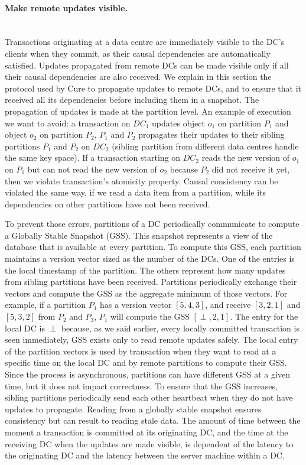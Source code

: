 \documentclass[11pt]{article}
\begin{document}
\paragraph{Make remote updates visible.}\mbox{}\\
Transactions originating at a data centre are immediately visible to the DC's
clients when they commit, as their causal dependencies are automatically
satisfied. Updates propagated from remote DCs can be made visible only if all
their causal dependencies are also received. We explain in this section the
protocol used by Cure to propagate updates to remote DCs, and to ensure that
it received all its dependencies before including them in a snapshot. The
propagation of updates is made at the partition level. An example of execution
we want to avoid: a transaction on $DC_1$ updates object $o_1$ on partition
$P_1$ and object $o_2$ on partition $P_2$, $P_1$ and $P_2$ propagates their
updates to their sibling partitions $P_1$ and $P_2$ on $DC_2$ (sibling
partition from different data centres handle the same key space). If a
transaction starting on $DC_2$ reads the new version of $o_1$ on $P_1$ but can
not read the new version of $o_2$ because $P_2$ did not receive it yet, then
we violate transaction's atomicity property. Causal consistency can be
violated the same way, if we read a data item from a partition, while its
dependencies on other partitions have not been received.

To prevent those errors, partitions of a DC periodically communicate to
compute a Globally Stable Snapshot (GSS). This snapshot represents a view of
the database that is available at every partition. To compute this GSS, each
partition maintains a version vector sized as the number of the DCs. One of
the entries is the local timestamp of the partition. The others represent how
many updates from sibling partitions have been received. Partitions
periodically exchange their vectors and compute the GSS as the aggregate
minimum of those vectors. For example, if a partition $P_1$ has a version
vector $[5, 4, 3]$, and receive $[3, 2, 1]$ and $[5, 3, 2]$ from $P_2$ and
$P_3$, $P_1$ will compute the GSS $[\perp, 2, 1]$. The entry for the local DC
is $\perp$ because, as we said earlier, every locally committed transaction is
seen immediately, GSS exists only to read remote updates safely. The local
entry of the partition vectors is used by transaction when they want to read
at a specific time on the local DC and by remote partitions to compute their
GSS. Since the process is asynchronous, partitions can have different GSS at a
given time, but it does not impact correctness. To ensure that the GSS
increases, sibling partitions periodically send each other heartbeat when they
do not have updates to propagate. Reading from a globally stable snapshot
ensures consistency but can result to reading stale data. The amount of time
between the moment a transaction is committed at its originating DC, and the
time at the receiving DC when the updates are made visible, is dependent of
the latency to the originating DC and the latency between the server machine
within a DC.
\end{document}
